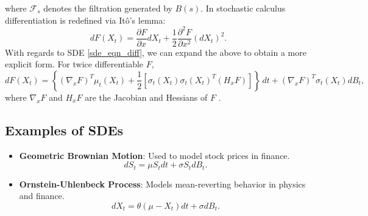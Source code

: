 \documentclass[11pt, twoside]{report}
\begin{document}
where $\mathcal{F}_s$ denotes the filtration generated by $B(s)$. In stochastic calculus differentiation is redefined via It\^{o}'s lemma:
\begin{equation} \label{ito_lem}
    dF(X_t) = \frac{\partial F}{\partial x} dX_t + \frac{1}{2} \frac{\partial^2 F}{\partial x^2} (dX_t)^2.
\end{equation}
With regards to SDE \ref{sde_eqn_diff}, we can expand the above to obtain a more explicit form. For twice differentiable $F$,
\begin{equation} \label{ito_lem_exp}
    dF(X_t) = \left\{(\nabla_x F)^T \mu_t(X_t) + \frac{1}{2} [\sigma_t(X_t)\sigma_t(X_t)^T (H_x F) ] \right\} \,dt + (\nabla_x F)^T \sigma_t(X_t) dB_t,
\end{equation}
where $\nabla_x F$ and $H_x F$ are the Jacobian and Hessians of $F$ \cite{pavliotis_book}.

\subsection{Examples of SDEs}
\begin{itemize}
    \item \textbf{Geometric Brownian Motion}: Used to model stock prices in finance.
    \begin{equation}
        dS_t = \mu S_t dt + \sigma S_t dB_t.
    \end{equation}
    \item \textbf{Ornstein-Uhlenbeck Process}: Models mean-reverting behavior in physics and finance.
    \begin{equation}
        dX_t = \theta (\mu - X_t) dt + \sigma dB_t.
    \end{equation}
\end{itemize}
\end{document}
